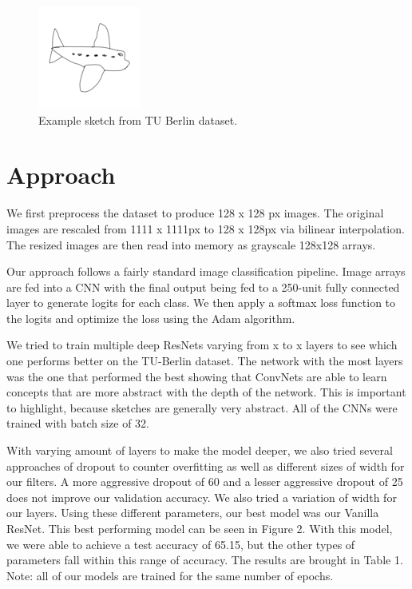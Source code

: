 \documentclass[10pt,twocolumn,letterpaper]{article}
\begin{document}
\begin{figure}[h]
	\begin{center}
	\includegraphics[width=0.5\linewidth]{airplane}
	\caption{Example sketch from TU Berlin dataset.}
	\end{center}
\end{figure}


\section{Approach}
We first preprocess the dataset to produce 128 x 128 px images. The original images are rescaled from 1111 x 1111px to 128 x 128px via bilinear interpolation. The resized images are then read into memory as grayscale 128x128 arrays.

Our approach follows a fairly standard image classification pipeline. Image arrays are fed into a CNN with the final output being fed to a 250-unit fully connected layer to generate logits for each class. We then apply a softmax loss function to the logits and optimize the loss using the Adam algorithm.

We tried to train multiple deep ResNets varying from x to x layers to see which one performs better on the TU-Berlin dataset. The network with the most layers was the one that performed the best showing that ConvNets are able to learn concepts that are more abstract with the depth of the network. This is important to highlight, because sketches are generally very abstract. All of the CNNs were trained with batch size of 32. 


With varying amount of layers to make the model deeper, we also tried several approaches of dropout to counter overfitting as well as different sizes of width for our filters. A more aggressive dropout of 60 and a lesser aggressive dropout of 25 does not improve our validation accuracy.  We also tried a variation of width for our layers. Using these different parameters, our best model was our Vanilla ResNet. This best performing model can be seen in Figure 2. With this model, we were able to achieve a test accuracy of 65.15, but the other types of parameters fall within this range of accuracy. The results are brought in Table 1. Note: all of our models are trained for the same number of epochs. 
\end{document}
